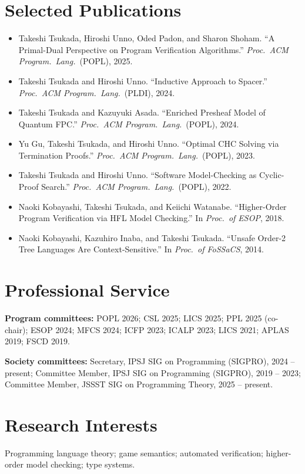 \documentclass[10pt,a4paper]{article}
\begin{document}
\section*{Selected Publications}
\begin{itemize}
  \item Takeshi Tsukada, Hiroshi Unno, Oded Padon, and Sharon Shoham.
        ``A Primal-Dual Perspective on Program Verification Algorithms.''
        \emph{Proc.\ ACM Program.\ Lang.}\ (POPL), 2025.
  \item Takeshi Tsukada and Hiroshi Unno.
        ``Inductive Approach to Spacer.''
        \emph{Proc.\ ACM Program.\ Lang.}\ (PLDI), 2024.
  \item Takeshi Tsukada and Kazuyuki Asada.
        ``Enriched Presheaf Model of Quantum FPC.''
        \emph{Proc.\ ACM Program.\ Lang.}\ (POPL), 2024.
  \item Yu Gu, Takeshi Tsukada, and Hiroshi Unno.
        ``Optimal CHC Solving via Termination Proofs.''
        \emph{Proc.\ ACM Program.\ Lang.}\ (POPL), 2023.
  \item Takeshi Tsukada and Hiroshi Unno.
        ``Software Model-Checking as Cyclic-Proof Search.''
        \emph{Proc.\ ACM Program.\ Lang.}\ (POPL), 2022.
  \item Naoki Kobayashi, Takeshi Tsukada, and Keiichi Watanabe.
        ``Higher-Order Program Verification via HFL Model Checking.''
        In \emph{Proc.\ of ESOP}, 2018.
  \item Naoki Kobayashi, Kazuhiro Inaba, and Takeshi Tsukada.
        ``Unsafe Order-2 Tree Languages Are Context-Sensitive.''
        In \emph{Proc.\ of FoSSaCS}, 2014.
\end{itemize}

\section*{Professional Service}
\textbf{Program committees:} POPL 2026; CSL 2025; LICS 2025; PPL 2025 (co-chair); ESOP 2024; MFCS 2024; ICFP 2023; ICALP 2023; LICS 2021; APLAS 2019; FSCD 2019.

\textbf{Society committees:} Secretary, IPSJ SIG on Programming (SIGPRO), 2024 -- present; Committee Member, IPSJ SIG on Programming (SIGPRO), 2019 -- 2023; Committee Member, JSSST SIG on Programming Theory, 2025 -- present.

\section*{Research Interests}
Programming language theory; game semantics; automated verification; higher-order model checking; type systems.
\end{document}
